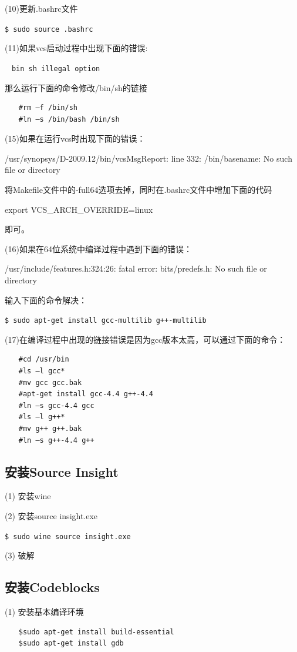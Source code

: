 (10)更新.bashrc文件

\verb"$ sudo source .bashrc"

(11)如果vcs启动过程中出现下面的错误:

\verb"　bin sh illegal option"

那么运行下面的命令修改/bin/sh的链接
\begin{verbatim}
　　#rm –f /bin/sh
　　#ln –s /bin/bash /bin/sh
\end{verbatim}

(15)如果在运行vcs时出现下面的错误：

/usr/synopsys/D-2009.12/bin/vcsMsgReport: line 332: /bin/basename: No such file or directory

将Makefile文件中的-full64选项去掉，同时在.bashrc文件中增加下面的代码

export VCS\_ARCH\_OVERRIDE=linux

即可。

(16)如果在64位系统中编译过程中遇到下面的错误：

/usr/include/features.h:324:26: fatal error: bits/predefs.h: No such file or directory

输入下面的命令解决：

\verb"$ sudo apt-get install gcc-multilib g++-multilib"

(17)在编译过程中出现的链接错误是因为gcc版本太高，可以通过下面的命令：
\begin{verbatim}
　　#cd /usr/bin
　　#ls –l gcc*
　　#mv gcc gcc.bak
　　#apt-get install gcc-4.4 g++-4.4
　　#ln –s gcc-4.4 gcc
　　#ls –l g++*
　　#mv g++ g++.bak
　　#ln –s g++-4.4 g++
\end{verbatim}

\subsection{安装Source Insight}
(1) 安装wine

(2) 安装source insight.exe

\verb"$ sudo wine source insight.exe"

(3) 破解

\subsection{安装Codeblocks}
(1) 安装基本编译环境
\begin{verbatim}
　　$sudo apt-get install build-essential
　　$sudo apt-get install gdb
\end{verbatim}

